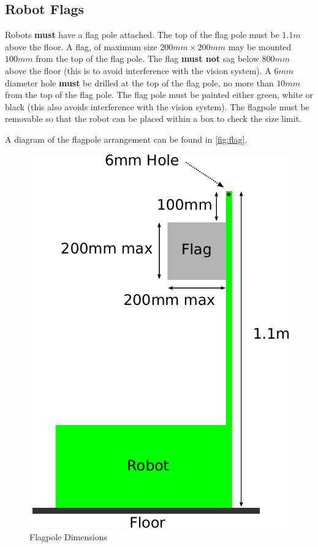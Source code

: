 \subsection{Robot Flags}
\label{sub:Flags}

Robots \textbf{must} have a flag pole attached.
The top of the flag pole must be $1.1m$ above the floor.
A flag, of maximum size $200mm \times 200mm$ may be mounted $100mm$ from the top of the flag pole.
The flag \textbf{must not} sag below $800mm$ above the floor (this is to avoid interference with the vision system).
A $6mm$ diameter hole \textbf{must} be drilled at the top of the flag pole, no more than $10mm$ from the top of the flag pole.
The flag pole must be painted either green, white or black (this also avoids interference with the vision system).
The flagpole must be removable so that the robot can be placed within a box to check the size limit.

A diagram of the flagpole arrangement can be found in \autoref{fig:flag}.

\begin{figure}
 \begin{center}
  \includegraphics[keepaspectratio, scale =0.7]{./images/flag-2011.pdf}
  \caption{\label{fig:flag}Flagpole Dimensions}
 \end{center}
\end{figure}
\clearpage
